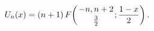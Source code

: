 \[\mathop{U_{n}\/}\nolimits\!\left(x\right)=(n+1)\mathop{F\/}\nolimits\!\left({-%
n,n+2\atop\frac{3}{2}};\frac{1-x}{2}\right).\]